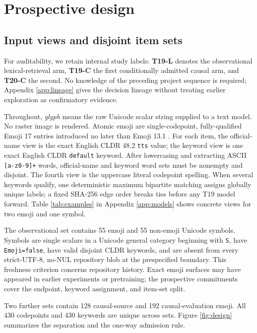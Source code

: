 \documentclass{article}
\begin{document}
\section{Prospective design}
\label{sec:design}

\subsection{Input views and disjoint item sets}

For auditability, we retain internal study labels: \textbf{T19-L} denotes the
observational lexical-retrieval arm, \textbf{T19-C} the first conditionally
admitted causal arm, and \textbf{T20-C} the second. No knowledge of the
preceding project sequence is required; Appendix \ref{app:lineage} gives the
decision lineage without treating earlier exploration as confirmatory
evidence.

Throughout, \emph{glyph} means the raw Unicode scalar string supplied to a
text model. No raster image is rendered. Atomic emoji are single-codepoint,
fully-qualified Emoji 17 entries introduced no later than Emoji 13.1
\citep{unicode2025emoji}. For each item, the official-name view is the exact
English CLDR 48.2 \texttt{tts} value; the keyword view is one exact English
CLDR \texttt{default} keyword. After lowercasing and extracting ASCII
\texttt{[a-z0-9]+} words, official-name and keyword word sets must be nonempty
and disjoint. The fourth view is the uppercase literal codepoint spelling.
When several keywords qualify, one deterministic maximum bipartite matching
assigns globally unique labels; a fixed SHA-256 edge order breaks ties before
any T19 model forward. Table \ref{tab:examples} in Appendix \ref{app:models}
shows concrete views for two emoji and one symbol.

The observational set contains 55 emoji and 55 non-emoji Unicode symbols.
Symbols are single scalars in a Unicode general category beginning with
\texttt{S}, have \texttt{Emoji=false}, have valid disjoint CLDR keywords, and
are absent from every strict-UTF-8, no-NUL repository blob at the prespecified
boundary. This freshness criterion concerns repository history. Exact emoji
surfaces may have appeared in earlier experiments or pretraining; the
prospective commitments cover the endpoint, keyword assignment, and item-set split.

Two further sets contain 128 causal-source and 192 causal-evaluation emoji.
All 430 codepoints and 430 keywords are unique across sets. Figure
\ref{fig:design} summarizes the separation and the one-way admission rule.
\end{document}
